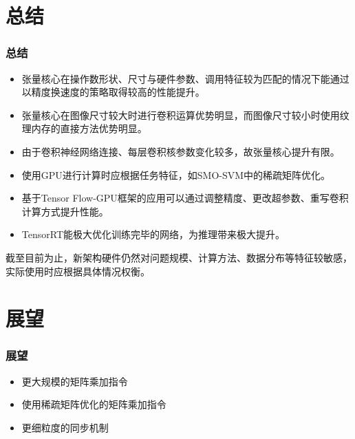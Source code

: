 \documentclass[10pt,aspectratio=169,mathserif]{beamer}
\begin{document}
	\section{总结}
	\begin{frame}
		\frametitle{总结}
		\begin{itemize}
			\item 张量核心在操作数形状、尺寸与硬件参数、调用特征较为匹配的情况下能通过以精度换速度的策略取得较高的性能提升。
			\item 张量核心在图像尺寸较大时进行卷积运算优势明显，而图像尺寸较小时使用纹理内存的直接方法优势明显。
			\item 由于卷积神经网络连接、每层卷积核参数变化较多，故张量核心提升有限。
			\item 使用GPU进行计算时应根据任务特征，如SMO-SVM中的稀疏矩阵优化。
			\item 基于Tensor Flow-GPU框架的应用可以通过调整精度、更改超参数、重写卷积计算方式提升性能。
			\item TensorRT能极大优化训练完毕的网络，为推理带来极大提升。
		\end{itemize}
		截至目前为止，新架构硬件仍然对问题规模、计算方法、数据分布等特征较敏感，实际使用时应根据具体情况权衡。
	\end{frame}

	\section{展望}
	\begin{frame}
		\frametitle{展望}
		\begin{itemize}
			\item 更大规模的矩阵乘加指令
			\item 使用稀疏矩阵优化的矩阵乘加指令
			\item 更细粒度的同步机制
		\end{itemize}
	\end{frame}
\end{document}
